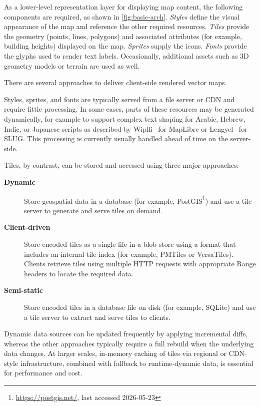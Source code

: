 As a lower-level representation layer for displaying map content, the following components are required, as shown in \cref{fig:basic-arch}.
\emph{Styles} define the visual appearance of the map and reference the other required resources.
\emph{Tiles} provide the geometry (points, lines, polygons) and associated attributes (for example, building heights) displayed on the map.
\emph{Sprites} supply the icons.
\emph{Fonts} provide the glyphs used to render text labels.
Occasionally, additional assets such as 3D geometry models or terrain are used as well.

There are several approaches to deliver client-side rendered vector maps.

Styles, sprites, and fonts are typically served from a file server or \ac{CDN} and require little processing.
In some cases, parts of these resources may be generated dynamically, for example to support complex text shaping for Arabic, Hebrew, Indic, or Japanese scripts as described by Wipfli~\cite{wipfliComplexTextPlugin2025} for MapLibre or Lengyel~\cite{lengelDecadeSlug} for SLUG.
This processing is currently usually handled ahead of time on the server-side.

Tiles, by contrast, can be stored and accessed using three major approaches:

\begin{description}
\item[\textbf{Dynamic}]
    Store geospatial data in a database (for example, PostGIS\footnote{\url{https://postgis.net/}, last accessed 2026-05-23}) and use a tile server to generate and serve tiles on demand.
\item[\textbf{Client-driven}]
    Store encoded tiles as a single file in a blob store using a format that includes an internal tile index (for example, PMTiles or VersaTiles).
    Clients retrieve tiles using multiple \ac{HTTP} requests with appropriate Range headers to locate the required data.
\item[\textbf{Semi-static}]
    Store encoded tiles in a database file on disk (for example, SQLite) and use a tile server to extract and serve tiles to clients.
\end{description}

Dynamic data sources can be updated frequently by applying incremental diffs, whereas the other approaches typically require a full rebuild when the underlying data changes.
At larger scales, in-memory caching of tiles via regional or \ac{CDN}-style infrastructure, combined with fallback to runtime-dynamic data, is essential for performance and cost.

